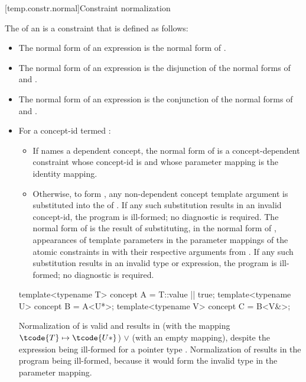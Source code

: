 [temp.constr.normal]{Constraint normalization}
%

\pnum
The  of an   is
a constraint that is defined as follows:
%
\begin{itemize}
\item
The normal form of an expression  is
the normal form of .

\item
The normal form of an expression  is
the disjunction of
the normal forms of  and .

\item
The normal form of an expression 
is the conjunction of
the normal forms of  and .

\item
For a concept-id  termed :
\begin{itemize}
\item
If  names a dependent concept,
the normal form of  is a concept-dependent constraint
whose concept-id is  and
whose parameter mapping is the identity mapping.
\item
Otherwise, to form ,
any non-dependent concept template argument 
is substituted into the  of .
If any such substitution results in an invalid concept-id,
the program is ill-formed; no diagnostic is required.
The normal form of  is the result of substituting,
in the normal form  of ,
appearances of  template parameters
in the parameter mappings of the atomic constraints in 
with their respective arguments from .
If any such substitution results in an invalid type or expression,
the program is ill-formed; no diagnostic is required.
\end{itemize}
\begin{example}
\begin{codeblock}
template<typename T> concept A = T::value || true;
template<typename U> concept B = A<U*>;
template<typename V> concept C = B<V&>;
\end{codeblock}
Normalization of  
is valid and results in
 (with the mapping $\tcode{T} \mapsto \tcode{U*}$)
$\lor$
 (with an empty mapping),
despite the expression  being ill-formed
for a pointer type .
Normalization of  
results in the program being ill-formed,
because it would form the invalid type 
in the parameter mapping.
\end{example}


\end{itemize}
